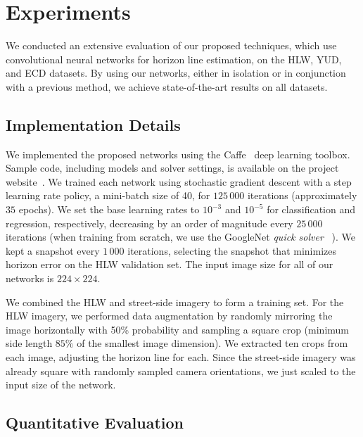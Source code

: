 \documentclass{bmvc2k}
\begin{document}
\section{Experiments}
\label{sec:bakeoff}

We conducted an extensive evaluation of our proposed techniques, which
use convolutional neural networks for horizon line estimation, on the
HLW, YUD, and ECD datasets. By using our networks, either in isolation
or in conjunction with a previous method, we achieve state-of-the-art
results on all datasets.



\subsection{Implementation Details}

We implemented the proposed networks using the Caffe~\cite{jia2014caffe}
deep learning toolbox. Sample code, including models and solver
settings, is available on the project website~\cite{hlwsite}.
We trained each network using stochastic gradient descent with
a step learning rate policy, a mini-batch size of 40, for $125\,000$
iterations (approximately $35$ epochs). We set the base learning rates
to $10^{-3}$ and $10^{-5}$ for classification and regression,
respectively, decreasing by an order of magnitude every $25\,000$
iterations (when training from scratch, we use the GoogleNet {\em
quick solver} ~\cite{jia2014caffe}). We kept a snapshot every $1\,000$
iterations, selecting the snapshot that minimizes horizon error on the
HLW validation set. The input image size for all of our networks is
$224 \times 224$. 

We combined the HLW and street-side imagery to form a training set. For
the HLW imagery, we performed data augmentation by randomly mirroring the image
horizontally with 50\% probability and sampling a square crop (minimum
side length $85\%$ of the smallest image dimension). We extracted ten
crops from each image, adjusting the horizon line for each. Since the
street-side imagery was already square with randomly sampled camera
orientations, we just scaled to the input size of the network. 

\subsection{Quantitative Evaluation}
\end{document}
